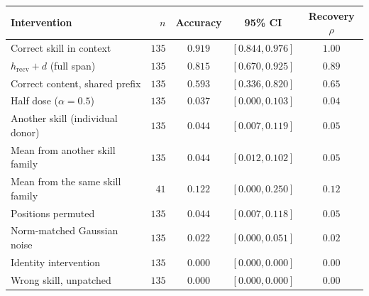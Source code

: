 \begin{tabular}{@{}lrccc@{}}
\toprule
Intervention & $n$ & Accuracy & 95\% CI & Recovery $\rho$ \\
\midrule
Correct skill in context & $135$ & $0.919$ & $[0.844,0.976]$ & $1.00$ \\
$h_{\mathrm{recv}}+d$ (full span) & $135$ & $0.815$ & $[0.670,0.925]$ & $0.89$ \\
Correct content, shared prefix & $135$ & $0.593$ & $[0.336,0.820]$ & $0.65$ \\
Half dose ($\alpha=0.5$) & $135$ & $0.037$ & $[0.000,0.103]$ & $0.04$ \\
Another skill (individual donor) & $135$ & $0.044$ & $[0.007,0.119]$ & $0.05$ \\
Mean from another skill family & $135$ & $0.044$ & $[0.012,0.102]$ & $0.05$ \\
Mean from the same skill family & $41$ & $0.122$ & $[0.000,0.250]$ & $0.12$ \\
Positions permuted & $135$ & $0.044$ & $[0.007,0.118]$ & $0.05$ \\
Norm-matched Gaussian noise & $135$ & $0.022$ & $[0.000,0.051]$ & $0.02$ \\
Identity intervention & $135$ & $0.000$ & $[0.000,0.000]$ & $0.00$ \\
Wrong skill, unpatched & $135$ & $0.000$ & $[0.000,0.000]$ & $0.00$ \\
\bottomrule
\end{tabular}
